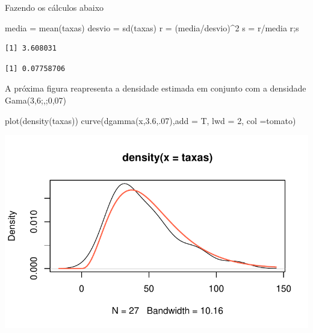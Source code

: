 \documentclass[
  letterpaper,
  DIV=11,
  numbers=noendperiod]{scrreprt}
\newenvironment{Shaded}{\begin{snugshade}}{\end{snugshade}}
\newcommand{\AttributeTok}[1]{\textcolor[rgb]{0.40,0.45,0.13}{#1}}
\newcommand{\DecValTok}[1]{\textcolor[rgb]{0.68,0.00,0.00}{#1}}
\newcommand{\FloatTok}[1]{\textcolor[rgb]{0.68,0.00,0.00}{#1}}
\newcommand{\FunctionTok}[1]{\textcolor[rgb]{0.28,0.35,0.67}{#1}}
\newcommand{\NormalTok}[1]{\textcolor[rgb]{0.00,0.23,0.31}{#1}}
\newcommand{\OtherTok}[1]{\textcolor[rgb]{0.00,0.23,0.31}{#1}}
\newcommand{\SpecialCharTok}[1]{\textcolor[rgb]{0.37,0.37,0.37}{#1}}
\newcommand{\StringTok}[1]{\textcolor[rgb]{0.13,0.47,0.30}{#1}}
\theoremstyle{definition}
\theoremstyle{plain}
\theoremstyle{definition}
\theoremstyle{remark}
\begin{document}
Fazendo os cálculos abaixo

\begin{Shaded}
\begin{Highlighting}[]
\NormalTok{media }\OtherTok{=} \FunctionTok{mean}\NormalTok{(taxas)}
\NormalTok{desvio }\OtherTok{=} \FunctionTok{sd}\NormalTok{(taxas)}
\NormalTok{r }\OtherTok{=}\NormalTok{ (media}\SpecialCharTok{/}\NormalTok{desvio)}\SpecialCharTok{\^{}}\DecValTok{2}
\NormalTok{s }\OtherTok{=}\NormalTok{ r}\SpecialCharTok{/}\NormalTok{media}
\NormalTok{r;s}
\end{Highlighting}
\end{Shaded}

\begin{verbatim}
[1] 3.608031
\end{verbatim}

\begin{verbatim}
[1] 0.07758706
\end{verbatim}

A próxima figura reapresenta a densidade estimada em conjunto com a
densidade Gama(3,6;,;0,07)

\begin{Shaded}
\begin{Highlighting}[]
\FunctionTok{plot}\NormalTok{(}\FunctionTok{density}\NormalTok{(taxas))}
\FunctionTok{curve}\NormalTok{(}\FunctionTok{dgamma}\NormalTok{(x,}\FloatTok{3.6}\NormalTok{,.}\DecValTok{07}\NormalTok{),}\AttributeTok{add =}\NormalTok{ T, }\AttributeTok{lwd =} \DecValTok{2}\NormalTok{, }\AttributeTok{col =}\StringTok{\textquotesingle{}tomato\textquotesingle{}}\NormalTok{)}
\end{Highlighting}
\end{Shaded}

\includegraphics{poisson_files/figure-pdf/unnamed-chunk-8-1.pdf}
\end{document}
